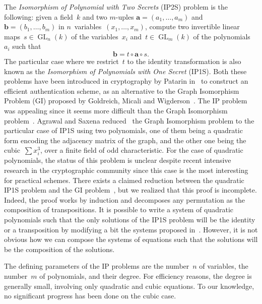 \documentclass{article}%
\DeclareMathOperator\GL{GL}
\begin{document}
The \emph{Isomorphism of Polynomial with Two Secrets} (IP2S) problem is
the following: given a field~$k$ and two $m$-uples $\bm{a} = (a_1, …,
a_m)$ and~$\bm{b} = (b_1, …, b_m)$ in $n$~variables~$(x_1, …, x_m)$, compute
two invertible linear maps~$s ∈ \GL_n(k)$ of the variables~$x_i$
and~$t ∈ \GL_m(k)$ of the polynomials~$a_i$ such that
\begin{equation*}
\bm{b} = t ∘ \bm{a} ∘ s.
\end{equation*}
The particular case where we restrict~$t$ to the identity transformation
is also known as the \emph{Isomorphism of Polynomials with One Secret}
(IP1S). Both these problems have been introduced in cryptography by
Patarin in~\cite{DBLP:conf/eurocrypt/Patarin96} to construct an efficient
authentication scheme, 
as an alternative to the Graph Isomorphism Problem (GI) proposed by Goldreich, Micali and Wigderson~\cite{DBLP:journals/jacm/GoldreichMW91}.
The IP problem was appealing since 
it seems more difficult than the Graph Isomorphism problem~\cite{DBLP:conf/eurocrypt/PatarinGC98}. 
Agrawal and Saxena reduced~\cite{DBLP:conf/stacs/AgrawalS06} the Graph
Isomorphism problem to the particular case of IP1S using two polynomials,
one of them being a quadratic form encoding the adjacency matrix of the
graph, and the other one being the cubic~$\sum x_i^3$, over a finite field of
odd characteristic.
For the case of quadratic polynomials, the status of this problem is unclear despite recent 
intensive research in the cryptographic community since this case is the most interesting 
for practical schemes. There exists a claimed reduction between the quadratic IP1S problem and the GI
problem~\cite{DBLP:conf/eurocrypt/PatarinGC98}, but we realized that this proof is incomplete. 
Indeed, the proof works by induction and decomposes any permutation as the composition of 
transpositions. It is possible to write a system of quadratic polynomials such that the only solutions 
of the IP1S problem will be the identity or a transposition by modifying a bit the systems proposed 
in~\cite{DBLP:conf/eurocrypt/PatarinGC98}. However, it is not obvious how we can compose the systems 
of equations such that the solutions will be the composition of the solutions. 

\bigbreak

The defining parameters of the IP problems are the number~$n$ of
variables, the number~$m$ of polynomials, and their degree. For
efficiency reasons, the degree is generally small, involving only
quadratic and cubic equations. To our knowledge, no significant progress
has been done on the cubic case.
\end{document}
